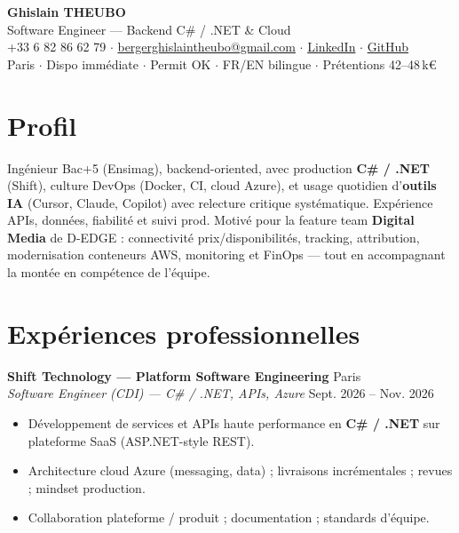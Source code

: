 \documentclass[10pt,a4paper]{article}
\begin{document}
\begin{center}
{\LARGE\bfseries Ghislain THEUBO}\\[2pt]
{\large Software Engineer --- Backend C\# / .NET \& Cloud}\\[3pt]
+33 6 82 86 62 79 $\cdot$
\href{mailto:bergerghislaintheubo@gmail.com}{bergerghislaintheubo@gmail.com} $\cdot$
\href{https://www.linkedin.com/in/berger-ghislain}{LinkedIn} $\cdot$
\href{https://github.com/Bergerghislain}{GitHub}\\[1pt]
Paris $\cdot$ Dispo imm\'ediate $\cdot$ Permit OK $\cdot$ FR/EN bilingue $\cdot$ Pr\'etentions 42--48\,k€
\end{center}

\section{Profil}
Ing\'enieur Bac+5 (Ensimag), backend-oriented, avec production \textbf{C\# / .NET} (Shift), culture DevOps (Docker, CI, cloud Azure), et usage quotidien d'\textbf{outils IA} (Cursor, Claude, Copilot) avec relecture critique syst\'ematique. Exp\'erience APIs, donn\'ees, fiabilit\'e et suivi prod. Motiv\'e pour la feature team \textbf{Digital Media} de D-EDGE : connectivit\'e prix/disponibilit\'es, tracking, attribution, modernisation conteneurs AWS, monitoring et FinOps --- tout en accompagnant la mont\'ee en comp\'etence de l'\'equipe.

\section{Exp\'eriences professionnelles}
\textbf{Shift Technology --- Platform Software Engineering} \hfill Paris\\
\textit{Software Engineer (CDI) --- C\# / .NET, APIs, Azure} \hfill Sept. 2026 -- Nov. 2026
\begin{itemize}
  \item D\'eveloppement de services et APIs haute performance en \textbf{C\# / .NET} sur plateforme SaaS (ASP.NET-style REST).
  \item Architecture cloud Azure (messaging, data) ; livraisons incr\'ementales ; revues ; mindset production.
  \item Collaboration plateforme / produit ; documentation ; standards d'\'equipe.
\end{itemize}
\end{document}
